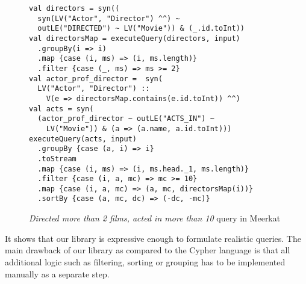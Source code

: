 \begin{figure}[h]
\begin{lstlisting}
val directors = syn((
  syn(LV("Actor", "Director") ^^) ~
  outLE("DIRECTED") ~ LV("Movie")) & (_.id.toInt))
val directorsMap = executeQuery(directors, input)
  .groupBy(i => i)
  .map {case (i, ms) => (i, ms.length)}
  .filter {case (_, ms) => ms >= 2}
val actor_prof_director =  syn(
  LV("Actor", "Director") ::
    V(e => directorsMap.contains(e.id.toInt)) ^^)
val acts = syn(
  (actor_prof_director ~ outLE("ACTS_IN") ~
    LV("Movie")) & (a => (a.name, a.id.toInt)))
executeQuery(acts, input)
  .groupBy {case (a, i) => i}
  .toStream
  .map {case (i, ms) => (i, ms.head._1, ms.length)}
  .filter {case (i, a, mc) => mc >= 10}
  .map {case (i, a, mc) => (a, mc, directorsMap(i))}
  .sortBy {case (a, mc, dc) => (-dc, -mc)}
\end{lstlisting}
\caption{\emph{Directed more than 2 films, acted in more than 10} query in Meerkat}
\label{fig:directed}
\end{figure}

It shows that our library is expressive enough to formulate realistic queries.
The main drawback of our library as compared to the Cypher language is that all additional logic such as
filtering, sorting or grouping has to be implemented manually as a separate step.